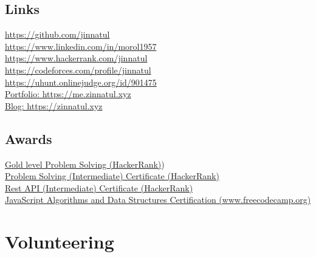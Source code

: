 \documentclass[]{deedy-resume-openfont}
\begin{document}
\begin{minipage}[t]{0.34\textwidth}

\subsection{Links} 
\textbullet{} \href{https://github.com/jinnatul}{https://github.com/jinnatul} \\
\textbullet{} \href{https://www.linkedin.com/in/morol1957}{https://www.linkedin.com/in/morol1957} \\
\textbullet{} \href{https://www.hackerrank.com/jinnatul}{https://www.hackerrank.com/jinnatul} \\
\textbullet{} \href{https://codeforces.com/profile/jinnatul}{https://codeforces.com/profile/jinnatul} \\
\textbullet{} \href{https://uhunt.onlinejudge.org/id/901475}{https://uhunt.onlinejudge.org/id/901475} \\
\textbullet{} \href{https://me.zinnatul.xyz}{Portfolio: https://me.zinnatul.xyz} \\
\textbullet{} \href{https://zinnatul.xyz}{Blog: https://zinnatul.xyz} \\
\sectionsep


\subsection{Awards} 
\textbullet{} \href{https://www.hackerrank.com/jinnatul}{Gold level Problem Solving (HackerRank)}) \\
\textbullet{} \href{https://www.hackerrank.com/certificates/be6cd61c8041}{Problem Solving (Intermediate) Certificate (HackerRank)} \\
\textbullet{} \href{https://www.hackerrank.com/certificates/1f0ca747169a}{Rest API (Intermediate) Certificate (HackerRank)} \\
\textbullet{} \href{https://www.freecodecamp.org/certification/jinnatul/javascript-algorithms-and-data-structures}{JavaScript Algorithms and Data Structures Certification (www.freecodecamp.org)} \\
\sectionsep


\section{Volunteering}

\end{minipage}
\end{document}
